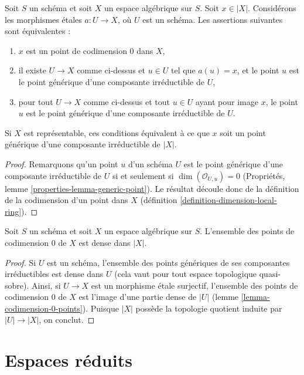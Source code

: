 \begin{lemma}
\label{lemma-codimension-0-points}
Soit $S$ un schéma et soit $X$ un espace algébrique sur $S$.
Soit $x \in |X|$. Considérons les morphismes \'etales $a : U \to X$, où
$U$ est un schéma. Les assertions suivantes sont équivalentes :
\begin{enumerate}
\item $x$ est un point de codimension $0$ dans $X$,
\item il existe $U \to X$ comme ci-dessus et $u \in U$ tel que $a(u) = x$,
et le point $u$ est le point générique d'une composante irréductible de $U$,
\item pour tout $U \to X$ comme ci-dessus et tout $u \in U$ ayant pour image $x$,
le point $u$ est le point générique d'une composante irréductible de $U$.
\end{enumerate}
Si $X$ est représentable, ces conditions équivalent à ce que $x$ soit un point générique
d'une composante irréductible de $|X|$.
\end{lemma}

\begin{proof}
Remarquons qu'un point $u$ d'un schéma $U$ est le point générique d'une
composante irréductible de $U$ si et seulement si $\dim(\mathcal{O}_{U, u}) = 0$
(Propriétés, lemme \ref{properties-lemma-generic-point}).
Le résultat découle donc de la définition de la codimension d'un
point dans $X$ (définition \ref{definition-dimension-local-ring}).
\end{proof}

\begin{lemma}
\label{lemma-codimension-0-points-dense}
Soit $S$ un schéma et soit $X$ un espace algébrique sur $S$.
L'ensemble des points de codimension $0$ de $X$ est dense dans $|X|$.
\end{lemma}

\begin{proof}
Si $U$ est un schéma, l'ensemble des points génériques de ses composantes
irréductibles est dense dans $U$ (cela vaut pour tout espace topologique quasi-sobre).
Ainsi, si $U \to X$ est un morphisme \'etale surjectif, l'ensemble
des points de codimension $0$ de $X$ est l'image d'une partie dense de
$|U|$ (lemme \ref{lemma-codimension-0-points}). Puisque $|X|$ possède la
topologie quotient induite par $|U| \to |X|$, on conclut.
\end{proof}





\section{Espaces réduits}
\label{section-reduced}

